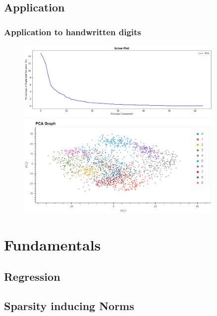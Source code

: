 \documentclass{beamer}
\theoremstyle{plain}
\theoremstyle{definition}
\begin{document}
\subsection{Application}
\begin{frame}
\frametitle{Application to handwritten digits}
\begin{figure}
\centering
\includegraphics[width = 0.9\textwidth]{figures/pca_handwritten_digits_scree.png}
\includegraphics[width = 0.9\textwidth]{figures/pca_handwritten_digits.png}
\end{figure}
\end{frame}


\section{Fundamentals}

\subsection{Regression}
\subsection{Sparsity inducing Norms}

\end{document}
